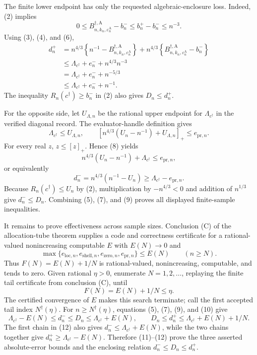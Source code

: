 The finite lower endpoint has only the requested algebraic-enclosure loss.  Indeed, (2) implies
\[
0\le
B_{n,k_n,\varepsilon_n^{\mathrm A}}^{\dagger,\mathrm A}-b_n^-
\le b_n^+-b_n^-\le n^{-3}. \tag{6}
\]
Using (3), (4), and (6),
\[
\begin{aligned}
d_n^+
&=n^{4/3}\left\{n^{-1}-
B_{n,k_n,\varepsilon_n^{\mathrm A}}^{\dagger,\mathrm A}\right\}
+n^{4/3}\left\{
B_{n,k_n,\varepsilon_n^{\mathrm A}}^{\dagger,\mathrm A}-b_n^-\right\}\\
&\le\Lambda_{c^\dagger}+e_n^-+n^{4/3}n^{-3}\\
&=\Lambda_{c^\dagger}+e_n^-+n^{-5/3}\\
&\le\Lambda_{c^\dagger}+e_n^-+n^{-1}.
\end{aligned} \tag{7}
\]
The inequality \(R_n(c^\dagger)\ge b_n^-\) in (2) also gives \(D_n\le d_n^+\).

For the opposite side, let \(U_{\Lambda,n}\) be the rational upper endpoint for \(\Lambda_{c^\dagger}\) in the verified diagonal record.  The evaluator-handle definition gives
\[
\Lambda_{c^\dagger}\le U_{\Lambda,n},
\qquad
\left[n^{4/3}(U_n-n^{-1})+U_{\Lambda,n}\right]_+
\le e_{\mathrm{pr},n}. \tag{8}
\]
For every real \(z\), \(z\le[z]_+\).  Hence (8) yields
\[
n^{4/3}(U_n-n^{-1})+\Lambda_{c^\dagger}
\le e_{\mathrm{pr},n},
\]
or equivalently
\[
d_n^-=n^{4/3}(n^{-1}-U_n)
\ge\Lambda_{c^\dagger}-e_{\mathrm{pr},n}. \tag{9}
\]
Because \(R_n(c^\dagger)\le U_n\) by (2), multiplication by \(-n^{4/3}<0\) and addition of \(n^{1/3}\) give \(d_n^-\le D_n\).  Combining (5), (7), and (9) proves all displayed finite-sample inequalities.

It remains to prove effectiveness across sample sizes.  Conclusion (C) of the allocation-tube theorem supplies a code and correctness certificate for a rational-valued nonincreasing computable \(E\) with \(E(N)\to0\) and
\[
\max\{e_{\mathrm{loc},n},e_{\mathrm{shell},n},
e_{\mathrm{zero},n},e_{\mathrm{pr},n}\}\le E(N)
\qquad(n\ge N). \tag{10}
\]
Thus \(F(N)=E(N)+1/N\) is rational-valued, nonincreasing, computable, and tends to zero.  Given rational \(\eta>0\), enumerate \(N=1,2,\ldots\), replaying the finite tail certificate from conclusion (C), until
\[
F(N)=E(N)+1/N\le\eta. \tag{11}
\]
The certified convergence of \(E\) makes this search terminate; call the first accepted tail index \(N^\dagger(\eta)\).  For \(n\ge N^\dagger(\eta)\), equations (5), (7), (9), and (10) give
\[
\Lambda_{c^\dagger}-E(N)\le d_n^-\le D_n
\le\Lambda_{c^\dagger}+E(N),
\qquad
D_n\le d_n^+\le\Lambda_{c^\dagger}+E(N)+1/N. \tag{12}
\]
The first chain in (12) also gives \(d_n^-\le\Lambda_{c^\dagger}+E(N)\), while the two chains together give \(d_n^+\ge\Lambda_{c^\dagger}-E(N)\).  Therefore (11)--(12) prove the three asserted absolute-error bounds and the enclosing relation \(d_n^-\le D_n\le d_n^+\).


